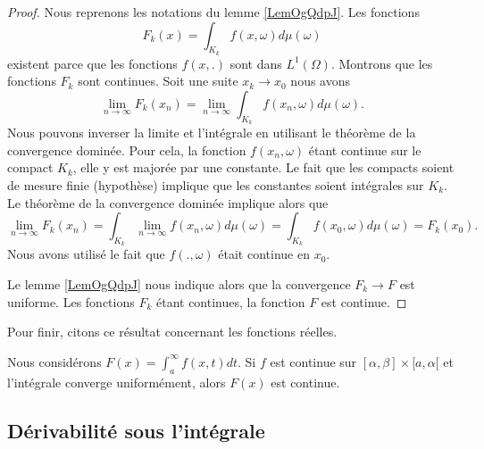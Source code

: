\begin{proof}
    Nous reprenons les notations du lemme \ref{LemOgQdpJ}. Les fonctions
    \begin{equation}
        F_k(x)=\int_{K_k}f(x,\omega)d\mu(\omega)
    \end{equation}
    existent parce que les fonctions \( f(x,.)\) sont dans \( L^1(\Omega)\). Montrons que les fonctions \( F_k\) sont continues. Soit une suite \( x_k\to x_0\) nous avons
    \begin{equation}
        \lim_{n\to \infty} F_k(x_n)=\lim_{n\to \infty} \int_{K_k}f(x_n,\omega)d\mu(\omega).
    \end{equation}
    Nous pouvons inverser la limite et l'intégrale en utilisant le théorème de la convergence dominée. Pour cela, la fonction \( f(x_n,\omega)\) étant continue sur le compact \( K_k\), elle y est majorée par une constante. Le fait que les compacts soient de mesure finie (hypothèse) implique que les constantes soient intégrales sur \( K_k\). Le théorème de la convergence dominée implique alors que
    \begin{equation}
        \lim_{n\to \infty} F_k(x_n)=\int_{K_k}\lim_{n\to \infty} f(x_n,\omega)d\mu(\omega)=\int_{K_k}f(x_0,\omega)d\mu(\omega)=F_k(x_0).
    \end{equation}
    Nous avons utilisé le fait que \( f(.,\omega)\) était continue en \( x_0\).

    Le lemme \ref{LemOgQdpJ} nous indique alors que la convergence \( F_k\to F\) est uniforme. Les fonctions \( F_k\) étant continues, la fonction \( F\) est continue.
\end{proof}


Pour finir, citons ce résultat concernant les fonctions réelles.
\begin{theorem}		\label{ThoInDerrtCvUnifFContinue}
    Nous considérons \( F(x)=\int_a^{\infty}f(x,t)dt\). Si \( f\) est continue sur $[\alpha,\beta]\times[a,\alpha[$ et l'intégrale converge uniformément, alors $F(x)$ est continue.
\end{theorem}

\subsection{Dérivabilité sous l'intégrale}

